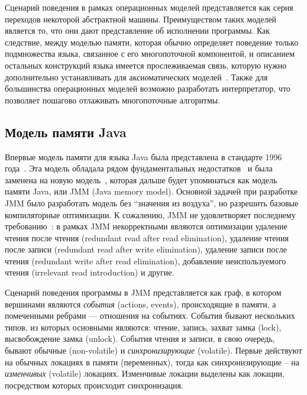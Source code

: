 Сценарий поведения в рамках операционных моделей представляется как
серия переходов некоторой абстрактной машины.
Преимуществом таких моделей является то, что они дают представление об исполнении программы.
Как следствие, между моделью памяти, которая обычно определяет поведение только подмножества языка, связанное с его многопоточной
компонентой, и описанием остальных конструкций языка имеется прослеживаемая связь, которую нужно дополнительно
устанавливать для аксиоматических моделей~\cite{Memarian-al:PLDI16}.
Также для большинства операционных моделей возможно разработать интерпретатор, что позволяет пошагово
отлаживать многопоточные алгоритмы.


\subsection{Модель памяти Java}
Впервые модель памяти для языка Java была представлена в стандарте 1996 года~\cite{Gosling-al:BOOK96}.
Эта модель обладала рядом фундаментальных недостатков~\cite{Pugh:JAVA99,Pugh:CPE00} и была заменена на
новую модель~\cite{Manson-al:POPL05}, которая дальше будет упоминаться как модель памяти Java, или
JMM\label{acr:jmm} (Java memory model).
Основной задачей при разработке JMM было разработать модель без ``значения из воздуха'',
но разрешить базовые компиляторные оптимизации.
К сожалению, JMM не удовлетворяет последнему требованию~\cite{Sevcik-Aspinall:ECOOP08}:
в рамках JMM некорректными являются оптимизации удаление чтения после чтения (redundant read after read elimination),
удаление чтения после записи (redundant read after write elimination),
удаление записи после чтения (redundant write after read elimination),
добавление неиспользуемого чтения (irrelevant read introduction) и другие.

Сценарий поведения программы в JMM представляется как граф, в котором вершинами
являются \emph{события} (actions, events), происходящие в памяти, а помеченными ребрами ---
отношения на событиях.
События бывают нескольких типов, из которых основными являются:
чтение, запись, захват замка (lock), высвобождение замка (unlock).
События чтения и записи, в свою очередь, бывают обычные (non-volatile) и \emph{синхронизирующие} (volatile).
Первые действуют на обычных локациях в памяти (переменных), тогда как синхронизирующие -- на
\emph{изменчивых} (volatile) локациях.
Изменчивые локации выделены как локации, посредством которых происходит синхронизация.

